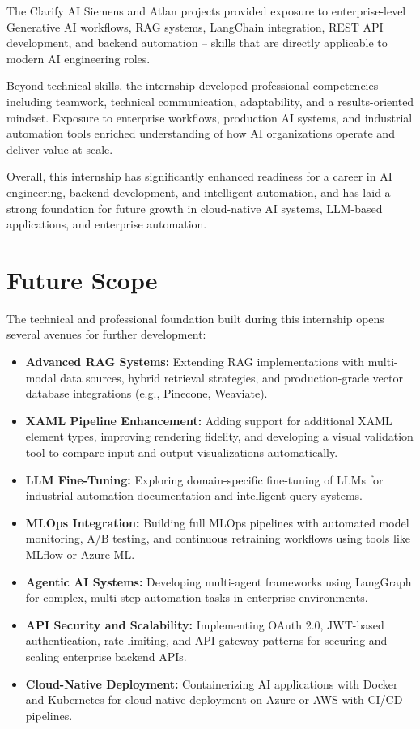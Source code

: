\documentclass[12pt,a4paper]{report}
\begin{document}
The Clarify AI Siemens and Atlan projects provided exposure to enterprise-level Generative AI workflows, RAG systems, LangChain integration, REST API development, and backend automation -- skills that are directly applicable to modern AI engineering roles.

Beyond technical skills, the internship developed professional competencies including teamwork, technical communication, adaptability, and a results-oriented mindset. Exposure to enterprise workflows, production AI systems, and industrial automation tools enriched understanding of how AI organizations operate and deliver value at scale.

Overall, this internship has significantly enhanced readiness for a career in AI engineering, backend development, and intelligent automation, and has laid a strong foundation for future growth in cloud-native AI systems, LLM-based applications, and enterprise automation.

\section{Future Scope}

The technical and professional foundation built during this internship opens several avenues for further development:
\begin{itemize}[leftmargin=1.5cm]
    \item \textbf{Advanced RAG Systems:} Extending RAG implementations with multi-modal data sources, hybrid retrieval strategies, and production-grade vector database integrations (e.g., Pinecone, Weaviate).
    \item \textbf{XAML Pipeline Enhancement:} Adding support for additional XAML element types, improving rendering fidelity, and developing a visual validation tool to compare input and output visualizations automatically.
    \item \textbf{LLM Fine-Tuning:} Exploring domain-specific fine-tuning of LLMs for industrial automation documentation and intelligent query systems.
    \item \textbf{MLOps Integration:} Building full MLOps pipelines with automated model monitoring, A/B testing, and continuous retraining workflows using tools like MLflow or Azure ML.
    \item \textbf{Agentic AI Systems:} Developing multi-agent frameworks using LangGraph for complex, multi-step automation tasks in enterprise environments.
    \item \textbf{API Security and Scalability:} Implementing OAuth 2.0, JWT-based authentication, rate limiting, and API gateway patterns for securing and scaling enterprise backend APIs.
    \item \textbf{Cloud-Native Deployment:} Containerizing AI applications with Docker and Kubernetes for cloud-native deployment on Azure or AWS with CI/CD pipelines.
\end{itemize}
\end{document}
